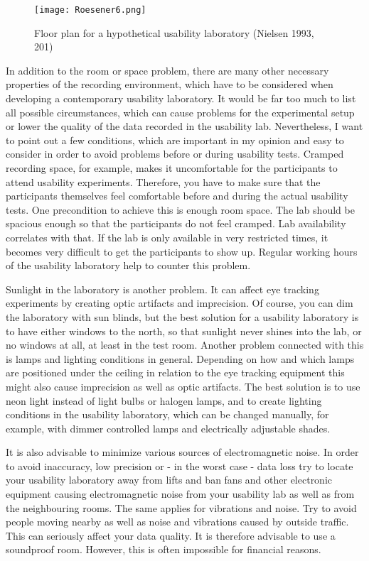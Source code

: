 \begin{
}[h]
\begin{figure}[h]
 \texttt{[image: Roesener6.png]}
 \caption{Floor plan for a hypothetical usability laboratory (Nielsen 1993, 201)}
 \label{fig:6}
\end{figure} 


In addition to the room or space problem, there are many other necessary properties of the recording environment, which have to be considered when developing a contemporary usability laboratory. It would be far too much to list all possible circumstances, which can cause problems for the experimental setup or lower the quality of the data recorded in the usability lab. Nevertheless, I want to point out a few conditions, which are important in my opinion and easy to consider in order to avoid problems before or during usability tests. Cramped recording space, for example, makes it uncomfortable for the participants to attend usability experiments. Therefore, you have to make sure that the participants themselves feel comfortable before and during the actual usability tests. One precondition to achieve this is enough room space. The lab should be spacious enough so that the participants do not feel cramped. Lab availability correlates with that. If the lab is only available in very restricted times, it becomes very difficult to get the participants to show up. Regular working hours of the usability laboratory help to counter this problem.

\begin{styleBodyTextIndent}
 Sunlight in the laboratory is another problem. It can affect eye tracking experiments by creating optic artifacts and imprecision. Of course, you can dim the laboratory with sun blinds, but the best solution for a usability laboratory is to have either windows to the north, so that sunlight never shines into the lab, or no windows at all, at least in the test room. Another problem connected with this is lamps and lighting conditions in general. Depending on how and which lamps are positioned under the ceiling in relation to the eye tracking equipment this might also cause imprecision as well as optic artifacts. The best solution is to use neon light instead of light bulbs or halogen lamps, and to create lighting conditions in the usability laboratory, which can be changed manually, for example, with dimmer controlled lamps and electrically adjustable shades.
\end{styleBodyTextIndent}

\begin{styleBodyTextIndent}
It is also advisable to minimize various sources of electromagnetic noise. In order to avoid inaccuracy, low precision or - in the worst case - data loss try to locate your usability laboratory away from lifts and ban fans and other electronic equipment causing electromagnetic noise from your usability lab as well as from the neighbouring rooms. The same applies for vibrations and noise. Try to avoid people moving nearby as well as noise and vibrations caused by outside traffic. This can seriously affect your data quality. It is therefore advisable to use a soundproof room. However, this is often impossible for financial reasons.
\end{styleBodyTextIndent}


\end{
}
